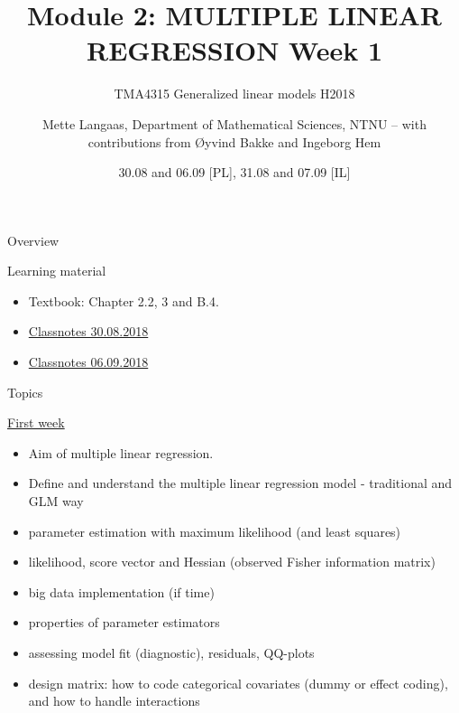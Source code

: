 \documentclass[
  ignorenonframetext,
]{beamer}
\title{Module 2: MULTIPLE LINEAR REGRESSION Week 1}
\subtitle{TMA4315 Generalized linear models H2018}
\author{Mette Langaas, Department of Mathematical Sciences, NTNU -- with
contributions from Øyvind Bakke and Ingeborg Hem}
\date{30.08 and 06.09 {[}PL{]}, 31.08 and 07.09 {[}IL{]}}
\providecommand{\tightlist}{%
  \setlength{\itemsep}{0pt}\setlength{\parskip}{0pt}}
\begin{document}
\frame{\titlepage}

\begin{frame}{Overview}
\label{overview}
\begin{block}{Learning material}
\label{learning-material}
\begin{itemize}
\tightlist
\item
  Textbook: Chapter 2.2, 3 and B.4.
\item
  \href{https://www.math.ntnu.no/emner/TMA4315/2018h/TMA4315M2H20180830.pdf}{Classnotes
  30.08.2018}
\item
  \href{https://www.math.ntnu.no/emner/TMA4315/2018h/TMA4315M2H20180906.pdf}{Classnotes
  06.09.2018}
\end{itemize}
\end{block}
\end{frame}

\begin{frame}
\begin{block}{Topics}
\label{topics}
\begin{block}{\hyperlink{firstweek}{First week}}
\label{first-week}
\begin{itemize}
\tightlist
\item
  Aim of multiple linear regression.
\item
  Define and understand the multiple linear regression model -
  traditional and GLM way
\item
  parameter estimation with maximum likelihood (and least squares)
\item
  likelihood, score vector and Hessian (observed Fisher information
  matrix)
\item
  big data implementation (if time)
\item
  properties of parameter estimators
\item
  assessing model fit (diagnostic), residuals, QQ-plots
\item
  design matrix: how to code categorical covariates (dummy or effect
  coding), and how to handle interactions
\end{itemize}
\end{block}
\end{block}
\end{frame}
\end{document}
